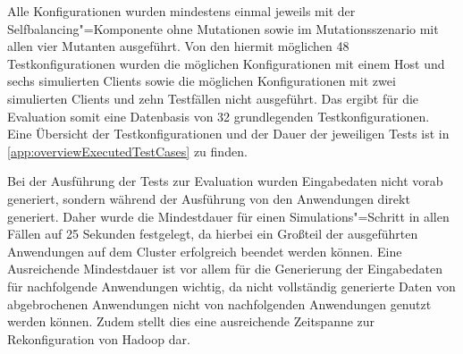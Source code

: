 Alle Konfigurationen wurden mindestens einmal jeweils mit der Selfbalancing"=Komponente ohne Mutationen sowie im Mutationsszenario mit allen vier Mutanten ausgeführt.
Von den hiermit möglichen 48 Testkonfigurationen wurden die möglichen Konfigurationen mit einem Host und sechs simulierten Clients sowie die möglichen Konfigurationen mit zwei simulierten Clients und zehn Testfällen nicht ausgeführt.
Das ergibt für die Evaluation somit eine Datenbasis von 32 grundlegenden Testkonfigurationen.
Eine Übersicht der Testkonfigurationen und der Dauer der jeweiligen Tests ist in \autoref{app:overviewExecutedTestCases} zu finden.

Bei der Ausführung der Tests zur Evaluation wurden Eingabedaten nicht vorab generiert, sondern während der Ausführung von den Anwendungen direkt generiert.
Daher wurde die Mindestdauer für einen Simulations"=Schritt in allen Fällen auf 25 Sekunden festgelegt, da hierbei ein Großteil der ausgeführten Anwendungen auf dem Cluster erfolgreich beendet werden können.
Eine Ausreichende Mindestdauer ist vor allem für die Generierung der Eingabedaten für nachfolgende Anwendungen wichtig, da nicht vollständig generierte Daten von abgebrochenen Anwendungen nicht von nachfolgenden Anwendungen genutzt werden können.
Zudem stellt dies eine ausreichende Zeitspanne zur Rekonfiguration von Hadoop dar.
